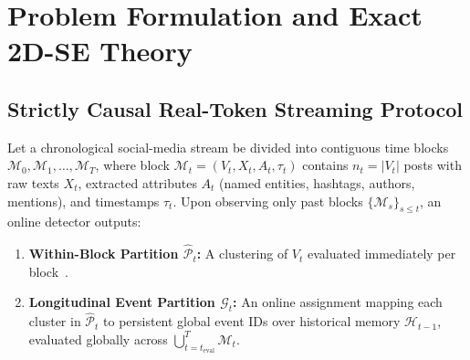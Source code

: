 \section{Problem Formulation and Exact 2D-SE Theory}
\label{sec:problem}

\subsection{Strictly Causal Real-Token Streaming Protocol}
Let a chronological social-media stream be divided into contiguous time blocks $\mathcal{M}_0, \mathcal{M}_1, \dots, \mathcal{M}_T$, where block $\mathcal{M}_t = (V_t, X_t, A_t, \tau_t)$ contains $n_t = |V_t|$ posts with raw texts $X_t$, extracted attributes $A_t$ (named entities, hashtags, authors, mentions), and timestamps $\tau_t$. Upon observing only past blocks $\{\mathcal{M}_s\}_{s \le t}$, an online detector outputs:
\begin{enumerate}
    \item \textbf{Within-Block Partition $\widehat{\mathcal{P}}_t$:} A clustering of $V_t$ evaluated immediately per block~\citep{cao2021kpgnn,cao2024hisevent}.
    \item \textbf{Longitudinal Event Partition $\mathcal{G}_t$:} An online assignment mapping each cluster in $\widehat{\mathcal{P}}_t$ to persistent global event IDs over historical memory $\mathcal{H}_{t-1}$, evaluated globally across $\bigcup_{t=t_{\text{eval}}}^{T} \mathcal{M}_t$.
\end{enumerate}

